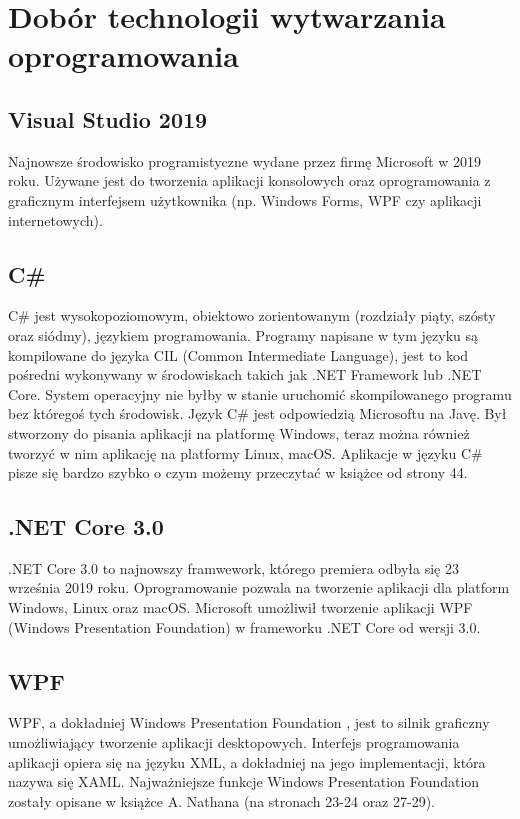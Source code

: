\section{Dobór technologii wytwarzania oprogramowania}
\subsection{Visual Studio 2019}
Najnowsze środowisko programistyczne \cite{VisualStudio} wydane przez firmę Microsoft w 2019 roku. Używane jest do tworzenia aplikacji konsolowych oraz oprogramowania z graficznym interfejsem użytkownika (np. Windows Forms, WPF czy aplikacji internetowych).

\subsection{C\#}
C\# \cite{CSharp} jest wysokopoziomowym, obiektowo zorientowanym \cite{CSharpBook} (rozdziały piąty, szósty oraz siódmy), językiem programowania. Programy napisane w tym języku są kompilowane do języka CIL (Common Intermediate Language), jest to kod pośredni wykonywany w środowiskach takich jak .NET Framework lub .NET Core. System operacyjny nie byłby w stanie uruchomić skompilowanego programu bez któregoś tych środowisk. Język C\# jest odpowiedzią Microsoftu na Javę. Był stworzony do pisania aplikacji na platformę Windows, teraz można również tworzyć w nim aplikację na platformy Linux, macOS. Aplikacje w języku C\# pisze się bardzo szybko o czym możemy przeczytać w książce \cite{CSharpBook} od strony 44. 

\subsection{.NET Core 3.0}
.NET Core 3.0 \cite{NetCore} to najnowszy framwework, którego premiera odbyła się 23 września 2019 roku. Oprogramowanie pozwala na tworzenie aplikacji dla platform Windows, Linux oraz macOS. Microsoft umożliwił tworzenie aplikacji WPF (Windows Presentation Foundation) w frameworku .NET Core od wersji 3.0. 

\subsection{WPF}
WPF, a dokładniej Windows Presentation Foundation \cite{WPF}, jest to silnik graficzny umożliwiający tworzenie aplikacji desktopowych. Interfejs programowania aplikacji opiera się na języku XML, a dokładniej na jego implementacji, która nazywa się XAML. Najważniejsze funkcje Windows Presentation Foundation zostały opisane w książce A. Nathana \cite{WPFBook} (na stronach 23-24 oraz 27-29). 

